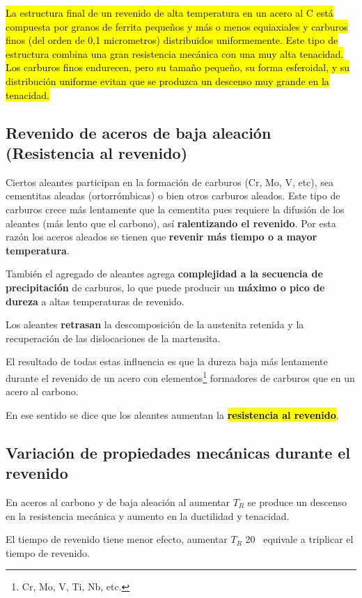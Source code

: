 \hl{La estructura final de un revenido de alta temperatura en un acero al C
está compuesta por granos de ferrita pequeños y más o menos equiaxiales
y carburos finos (del orden de 0,1 micrometros) distribuidos uniformemente. Este
tipo de estructura combina una gran resistencia mecánica con una
muy alta tenacidad. Los carburos finos endurecen, pero su tamaño
pequeño, su forma esferoidal, y su distribución uniforme evitan que se
produzca un descenso muy grande en la tenacidad.}

\subsection[Resistencia al revenido]{Revenido de aceros de baja aleación (Resistencia al revenido)}

Ciertos aleantes participan en la formación de carburos (Cr, Mo, V, etc), sea cementitas aleadas (ortorrómbicas) o bien otros carburos aleados. Este tipo de carburos crece más lentamente que la cementita pues requiere la difusión de los aleantes (más lento que el carbono), así \textbf{ralentizando el revenido}. Por esta razón los aceros aleados se tienen que \textbf{revenir más tiempo o a mayor temperatura}.

También el agregado de aleantes agrega \textbf{complejidad a la secuencia de precipitación} de carburos, lo que puede producir un \textbf{máximo o pico de dureza} a altas temperaturas de revenido.

Los aleantes \textbf{retrasan} la descomposición de la austenita retenida y la recuperación de las dislocaciones de la martensita.



El resultado de todas estas influencia es que la dureza baja más lentamente durante el revenido de un acero con elementos\footnote{Cr, Mo, V, Ti, Nb, etc.} formadores de carburos que en un acero al carbono.

En ese sentido se dice que los aleantes aumentan la \hl{\textbf{resistencia al revenido}}. \cite{guille}

\subsection{Variación de propiedades mecánicas durante el revenido}
En aceros al carbono y de baja aleación al aumentar $T_R$ se produce un descenso en la resistencia mecánica y aumento en la ductilidad y tenacidad. 

El tiempo de revenido tiene menor efecto, aumentar $T_R$ 20\grad~ equivale a triplicar el tiempo de revenido.

